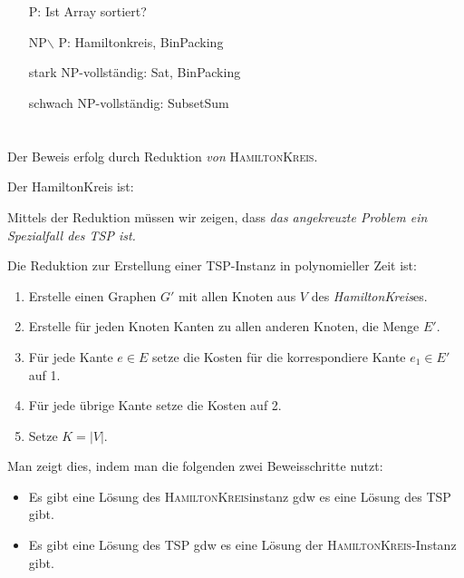 \documentclass{article}
\begin{document}
\section{}
\begin{enumerate}
  \item[P:] Ist Array sortiert?
  \item[NP$\backslash$ P:] Hamiltonkreis, BinPacking
  \item[stark NP-vollständig:] Sat, BinPacking
  \item[schwach NP-vollständig:] SubsetSum
\end{enumerate}

\section{}
Der Beweis erfolg durch Reduktion \emph{von} \textsc{HamiltonKreis}.

Der HamiltonKreis ist:

Mittels der Reduktion müssen wir zeigen, dass \emph{das angekreuzte Problem ein Spezialfall des TSP ist.}

Die Reduktion zur Erstellung einer TSP-Instanz in polynomieller Zeit ist:
\begin{enumerate}
	\item Erstelle einen Graphen $G'$ mit allen Knoten aus $V$ des \emph{HamiltonKreis}es. 
  \item Erstelle für jeden Knoten Kanten zu allen anderen Knoten, die Menge $E'$.
  \item Für jede Kante $e\in E$ setze die Kosten für die korrespondiere Kante $e_1\in E'$ auf 1.
  \item Für jede übrige Kante setze die Kosten auf 2.
  \item Setze $K = |V|$.
\end{enumerate}

Man zeigt dies, indem man die folgenden zwei Beweisschritte nutzt:
\begin{itemize}
	\item Es gibt eine Lösung des \textsc{HamiltonKreis}instanz gdw es eine Lösung des \textsc{TSP} gibt.
  \item Es gibt eine Lösung des \textsc{TSP} gdw es eine Lösung der \textsc{HamiltonKreis}-Instanz gibt.
\end{itemize}
\end{document}
